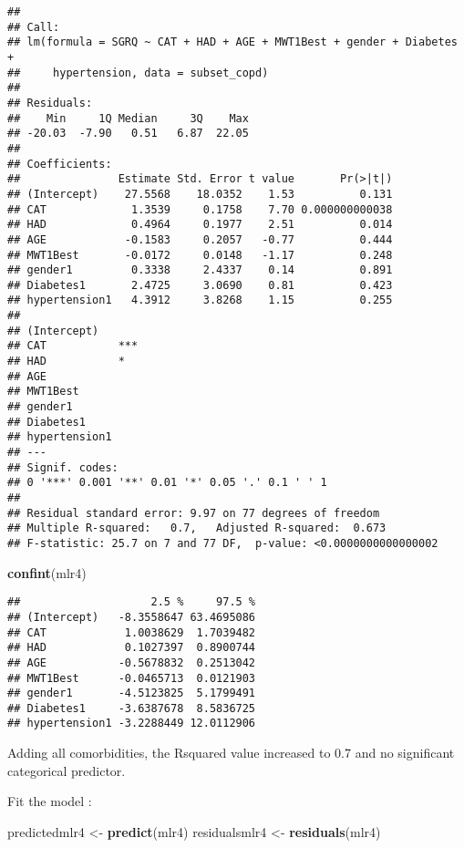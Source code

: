 \documentclass[
]{article}
\newenvironment{Shaded}{\begin{snugshade}}{\end{snugshade}}
\newcommand{\FunctionTok}[1]{\textcolor[rgb]{0.13,0.29,0.53}{\textbf{#1}}}
\newcommand{\NormalTok}[1]{#1}
\newcommand{\OtherTok}[1]{\textcolor[rgb]{0.56,0.35,0.01}{#1}}
\begin{document}
\begin{verbatim}
## 
## Call:
## lm(formula = SGRQ ~ CAT + HAD + AGE + MWT1Best + gender + Diabetes + 
##     hypertension, data = subset_copd)
## 
## Residuals:
##    Min     1Q Median     3Q    Max 
## -20.03  -7.90   0.51   6.87  22.05 
## 
## Coefficients:
##               Estimate Std. Error t value       Pr(>|t|)
## (Intercept)    27.5568    18.0352    1.53          0.131
## CAT             1.3539     0.1758    7.70 0.000000000038
## HAD             0.4964     0.1977    2.51          0.014
## AGE            -0.1583     0.2057   -0.77          0.444
## MWT1Best       -0.0172     0.0148   -1.17          0.248
## gender1         0.3338     2.4337    0.14          0.891
## Diabetes1       2.4725     3.0690    0.81          0.423
## hypertension1   4.3912     3.8268    1.15          0.255
##                  
## (Intercept)      
## CAT           ***
## HAD           *  
## AGE              
## MWT1Best         
## gender1          
## Diabetes1        
## hypertension1    
## ---
## Signif. codes:  
## 0 '***' 0.001 '**' 0.01 '*' 0.05 '.' 0.1 ' ' 1
## 
## Residual standard error: 9.97 on 77 degrees of freedom
## Multiple R-squared:   0.7,   Adjusted R-squared:  0.673 
## F-statistic: 25.7 on 7 and 77 DF,  p-value: <0.0000000000000002
\end{verbatim}

\begin{Shaded}
\begin{Highlighting}[]
\FunctionTok{confint}\NormalTok{(mlr4)}
\end{Highlighting}
\end{Shaded}

\begin{verbatim}
##                    2.5 %     97.5 %
## (Intercept)   -8.3558647 63.4695086
## CAT            1.0038629  1.7039482
## HAD            0.1027397  0.8900744
## AGE           -0.5678832  0.2513042
## MWT1Best      -0.0465713  0.0121903
## gender1       -4.5123825  5.1799491
## Diabetes1     -3.6387678  8.5836725
## hypertension1 -3.2288449 12.0112906
\end{verbatim}

Adding all comorbidities, the Rsquared value increased to 0.7 and no
significant categorical predictor.

Fit the model :

\begin{Shaded}
\begin{Highlighting}[]
\NormalTok{predictedmlr4 }\OtherTok{\textless{}{-}} \FunctionTok{predict}\NormalTok{(mlr4)}
\NormalTok{residualsmlr4 }\OtherTok{\textless{}{-}} \FunctionTok{residuals}\NormalTok{(mlr4)}
\end{Highlighting}
\end{Shaded}
\end{document}
